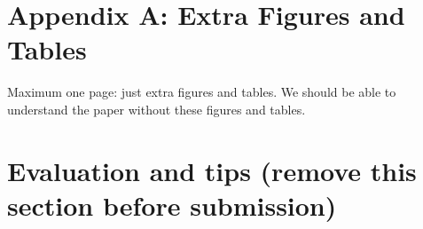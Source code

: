 \documentclass[twocolumn,10pt]{article}
\begin{document}

\appendix

\section*{Appendix A: Extra Figures and Tables}

Maximum one page: just extra figures and tables. We should be able to understand the paper without these figures and tables.

\section{Evaluation and tips (remove this section before submission)}
\end{document}

